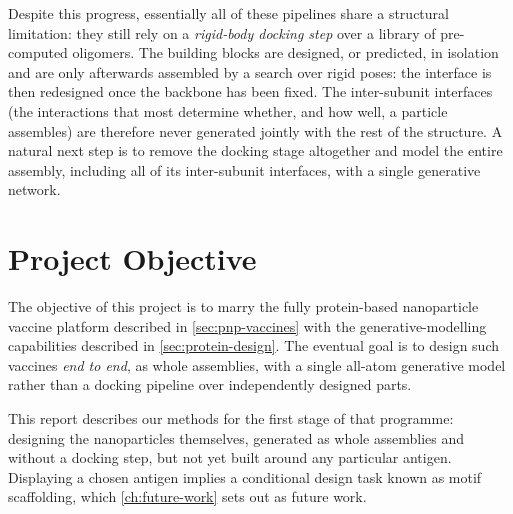 Despite this progress, essentially all of these pipelines share a structural
limitation: they still rely on a \emph{rigid-body docking step} over a library of
pre-computed oligomers. The building blocks are designed, or predicted, in
isolation and are only afterwards assembled by a search over rigid poses: the
interface is then redesigned once the backbone has been fixed. The
inter-subunit interfaces (the interactions that most determine whether, and how
well, a particle assembles) are therefore never generated jointly with the rest
of the structure. A natural next step is to remove the docking stage altogether
and model the entire assembly, including all of its inter-subunit interfaces, with
a single generative network.


\section{Project Objective}
\label{sec:objective}

The objective of this project is to marry the fully protein-based nanoparticle
vaccine platform described in \cref{sec:pnp-vaccines} with the
generative-modelling capabilities described in \cref{sec:protein-design}.
The eventual goal is to design such vaccines \emph{end to end}, as whole
assemblies, with a single all-atom generative model rather than a docking
pipeline over independently designed parts.

This report describes our methods for the first stage of that programme:
designing the nanoparticles themselves, generated as whole assemblies and without
a docking step, but not yet built around any particular antigen. Displaying a
chosen antigen implies a conditional design task known as motif scaffolding, which
\cref{ch:future-work} sets out as future work.


